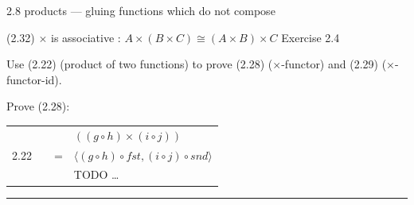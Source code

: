 \documentclass[presentation]{beamer}
\begin{document}
\begin{frame}[fragile,label=sec-7]{2.8 products --- gluing functions which do not compose}
\begin{block}{(2.32) $\times$ is associative : $A \times (B \times C) \cong (A \times B) \times C$}
\alert{Exercise 2.4}

Use (2.22) (product of two functions) to prove (2.28) ($\times$-functor) and (2.29) ($\times$-functor-id).

Prove (2.28):

\begin{center}
\begin{tabular}{rlll}
 &  &  & $((g \circ h) \times (i \circ j))$\\
2.22 &  & = & $\langle (g \circ h) \circ fst, (i \circ j) \circ snd \rangle$\\
 &  &  & TODO \ldots{}\\
\end{tabular}
\end{center}


\rule{\linewidth}{0.5pt}
\end{block}
\end{frame}
\end{document}
